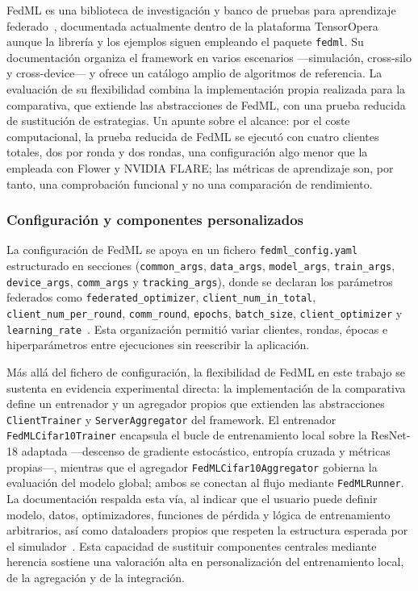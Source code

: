 FedML es una biblioteca de investigación y banco de pruebas para aprendizaje
federado~\parencite{he2020fedml}, documentada actualmente dentro de la plataforma
TensorOpera aunque la librería y los ejemplos siguen empleando el paquete
\texttt{fedml}. Su documentación organiza el framework en varios escenarios
—simulación, cross-silo y cross-device— y ofrece un catálogo amplio de algoritmos
de referencia. La evaluación de su flexibilidad combina la implementación propia
realizada para la comparativa, que extiende las abstracciones de FedML, con una
prueba reducida de sustitución de estrategias. Un apunte sobre el alcance:
por el coste computacional, la prueba reducida de FedML se ejecutó con cuatro
clientes totales, dos por ronda y dos rondas, una configuración algo menor que la
empleada con Flower y NVIDIA FLARE; las métricas de aprendizaje son, por tanto, una
comprobación funcional y no una comparación de rendimiento.

\subsubsection{Configuración y componentes personalizados}\label{subsec:flex-fedml-config}

La configuración de FedML se apoya en un fichero \texttt{fedml\_\allowbreak config.yaml}
estructurado en secciones (\texttt{common\_\allowbreak args}, \texttt{data\_\allowbreak args},
\texttt{model\_\allowbreak args}, \texttt{train\_\allowbreak args}, \texttt{device\_\allowbreak args},
\texttt{comm\_\allowbreak args} y \texttt{tracking\_\allowbreak args}), donde se declaran los parámetros
federados como \texttt{federated\_\allowbreak optimizer}, \texttt{client\_\allowbreak num\_\allowbreak in\_\allowbreak total},
\texttt{client\_\allowbreak num\_\allowbreak per\_\allowbreak round}, \texttt{comm\_\allowbreak round}, \texttt{epochs},
\texttt{batch\_\allowbreak size}, \texttt{client\_\allowbreak optimizer} y \texttt{learning\_\allowbreak rate}~\parencite{fedmlSimApi}.
Esta organización permitió variar clientes, rondas, épocas e hiperparámetros entre
ejecuciones sin reescribir la aplicación.

Más allá del fichero de configuración, la flexibilidad de FedML en este trabajo se
sustenta en evidencia experimental directa: la implementación de la comparativa
define un entrenador y un agregador propios que extienden las abstracciones
\texttt{ClientTrainer} y \texttt{ServerAggregator} del
framework. El entrenador \texttt{FedMLCifar10Trainer} encapsula el bucle de
entrenamiento local sobre la ResNet-18 adaptada —descenso de gradiente estocástico,
entropía cruzada y métricas propias—, mientras que el agregador
\texttt{FedMLCifar10Aggregator} gobierna la evaluación del modelo global; ambos se
conectan al flujo mediante \texttt{FedMLRunner}. La documentación respalda esta vía,
al indicar que el usuario puede definir modelo, datos, optimizadores, funciones de
pérdida y lógica de entrenamiento arbitrarios, así como dataloaders propios que
respeten la estructura esperada por el simulador~\parencite{fedmlTrainer,fedmlDataloader}.
Esta capacidad de sustituir componentes centrales mediante herencia sostiene una
valoración alta en personalización del entrenamiento local, de la agregación y de la
integración.

